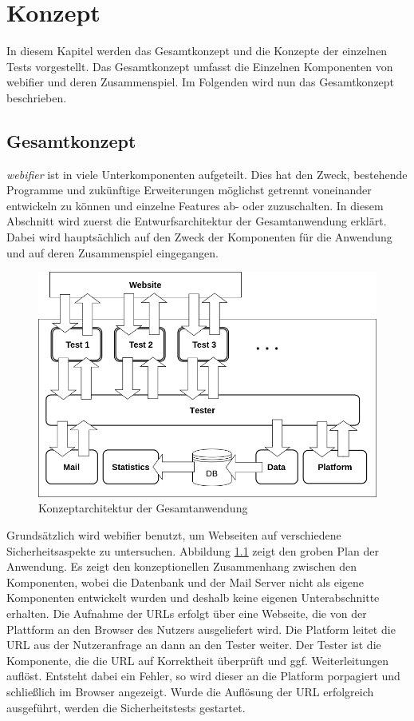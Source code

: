 \chapter{Konzept}

In diesem Kapitel werden das Gesamtkonzept und die Konzepte der einzelnen Tests vorgestellt. Das Gesamtkonzept umfasst die Einzelnen Komponenten von webifier und deren Zusammenspiel. Im Folgenden wird nun das Gesamtkonzept beschrieben.

\section{Gesamtkonzept}

\textit{webifier} ist in viele Unterkomponenten aufgeteilt.
Dies hat den Zweck, bestehende Programme und zukünftige Erweiterungen möglichst getrennt voneinander entwickeln zu können und einzelne Features ab- oder zuzuschalten.
In diesem Abschnitt wird zuerst die Entwurfsarchitektur der Gesamtanwendung erklärt.
Dabei wird hauptsächlich auf den Zweck der Komponenten für die Anwendung und auf deren Zusammenspiel eingegangen.

\begin{figure}[H]
	\centering
	\includegraphics[width=\textwidth]{images/anwendung-konzept}
	\caption{Konzeptarchitektur der Gesamtanwendung}
	\label{fig:anwendung-konzept}
\end{figure}

Grundsätzlich wird webifier benutzt, um Webseiten auf verschiedene Sicherheitsaspekte zu untersuchen.
Abbildung \ref{fig:anwendung-konzept} zeigt den groben Plan der Anwendung.
Es zeigt den konzeptionellen Zusammenhang zwischen den Komponenten, wobei die Datenbank und der Mail Server nicht als eigene Komponenten entwickelt wurden und deshalb keine eigenen Unterabschnitte erhalten.
Die Aufnahme der URLs erfolgt über eine Webseite, die von der Plattform an den Browser des Nutzers ausgeliefert wird.
Die Platform leitet die \ac{URL} aus der Nutzeranfrage an dann an den Tester weiter.
Der Tester ist die Komponente, die die \ac{URL} auf Korrektheit überprüft und ggf. Weiterleitungen auflöst.
Entsteht dabei ein Fehler, so wird dieser an die Platform porpagiert und schließlich im Browser angezeigt.
Wurde die Auflösung der \ac{URL} erfolgreich ausgeführt, werden die Sicherheitstests gestartet.

